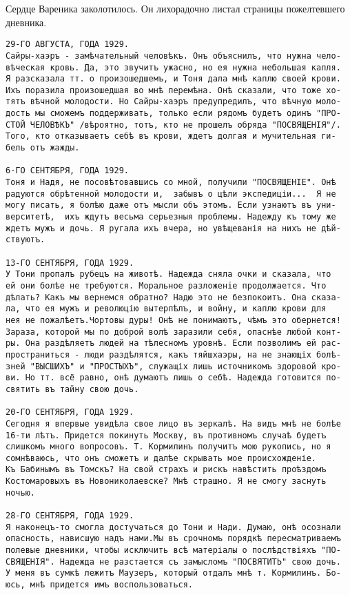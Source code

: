 \documentclass[a4paper,10pt,fleqn]{book}\usepackage{polyglossia}\setdefaultlanguage{english}\setotherlanguage{russian}\defaultfontfeatures{Ligatures=TeX,Mapping=tex-text} \usepackage{xcolor}\definecolor{lightgray}{HTML}{bbbbbb}\color{lightgray}\newcommand{\ml}[3]{\textcolor{black}{#3}}
\begin{document}
Сердце Вареника заколотилось.
Он лихорадочно листал страницы пожелтевшего дневника.

\begin{verbatim}
29-ГО АВГУСТА, ГОДА 1929.
Сайры-хаэръ - замѣчательный человѣкъ. Онъ объяснилъ, что нужна чело-
вѣческая кровь. Да, это звучитъ ужасно, но ея нужна небольшая капля.
Я разсказала тт. о произошедшемъ, и Тоня дала мнѣ каплю своей крови.
Ихъ поразила произошедшая во мнѣ перемѣна. Онѣ сказали, что тоже хо-
тятъ вѣчной молодости. Но Сайры-хаэръ предупредилъ, что вѣчную моло-
дость мы сможемъ поддерживать, только если рядомъ будетъ одинъ "ПРО-
СТОЙ ЧЕЛОВѢКЪ" /вѣроятно, тотъ, кто не прошелъ обряда "ПОСВЯЩЕНІЯ"/.
Того, кто отказываетъ себѣ въ крови, ждетъ долгая и мучительная ги-
бель отъ жажды.

6-ГО СЕНТЯБРЯ, ГОДА 1929.
Тоня и Надя, не посовѣтовавшись со мной, получили "ПОСВЯЩЕНІЕ". Онѣ
радуются обрѣтенной молодости и,  забывъ о цѣли экспедиціи...  Я не
могу писать, я болѣю даже отъ мысли объ этомъ. Если узнаютъ въ уни-
верситетѣ,  ихъ ждутъ весьма серьезныя проблемы. Надежду къ тому же
ждетъ мужъ и дочь. Я ругала ихъ вчера, но увѣщеванія на нихъ не дѣй-
ствуютъ.

13-ГО СЕНТЯБРЯ, ГОДА 1929.
У Тони пропалъ рубецъ на животѣ. Надежда сняла очки и сказала, что
ей они болѣе не требуются. Моральное разложенiе продолжается. Что
дѣлать? Какъ мы вернемся обратно? Надю это не безпокоитъ. Она сказа-
ла, что ея мужъ и революцію вытерпѣлъ, и войну, и каплю крови для
нея не пожалѣетъ.Чортовы дуры! Онѣ не понимаютъ, чѣмъ это обернется!
Зараза, которой мы по доброй волѣ заразили себя, опаснѣе любой конт-
ры. Она раздѣляетъ людей на тѣлесномъ уровнѣ. Если позволимъ ей рас-
пространиться - люди раздѣлятся, какъ тяйшхаэры, на не знающіх болѣ-
зней "ВЫСШИХЪ" и "ПРОСТЫХЪ", служащіх лишь источникомъ здоровой кро-
ви. Но тт. всё равно, онѣ думаютъ лишь о себѣ. Надежда готовится по-
святить въ тайну свою дочь.

20-ГО СЕНТЯБРЯ, ГОДА 1929.
Сегодня я впервые увидѣла свое лицо въ зеркалѣ. На видъ мнѣ не болѣе
16-ти лѣтъ. Придется покинуть Москву, въ противномъ случаѣ будетъ
слишкомъ много вопросовъ. Т. Кормилинъ получитъ мою рукопись, но я
сомнѣваюсь, что онъ сможетъ и далѣе скрывать мое происхожденіе.
Къ Бабинымъ въ Томскъ? На свой страхъ и рискъ навѣстить проѣздомъ
Костомаровыхъ въ Новониколаевске? Мнѣ страшно. Я не смогу заснуть
ночью.

28-ГО СЕНТЯБРЯ, ГОДА 1929.
Я наконецъ-то смогла достучаться до Тони и Нади. Думаю, онѣ осознали
опасность, нависшую надъ нами.Мы въ срочномъ порядкѣ пересматриваемъ
полевые дневники, чтобы исключить всѣ матеріалы о послѣдствіяхъ "ПО-
СВЯЩЕНІЯ". Надежда не разстается съ замысломъ "ПОСВЯТИТЬ" свою дочь.
У меня въ сумкѣ лежитъ Маузеръ, который отдалъ мнѣ т. Кормилинъ. Бо-
юсь, мнѣ придется имъ воспользоваться.
\end{verbatim}
\end{document}
